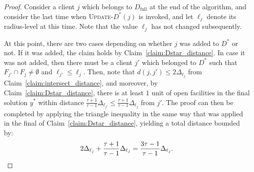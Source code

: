 \begin{proof}
Consider a client $j$ which belongs to $D_\text{full}$ at the end of the algorithm, and consider the last time when \textsc{Update-$D^*$}$(j)$ is invoked, and let $\ell_j$ denote its radius-level at this time. Note that the value $\ell_j$ has not changed subsequently.

At this point, there are two cases depending on whether $j$ was added to $D^*$ or not. If it was added, the claim holds by Claim~\ref{claim:Dstar_distance}. In case it was not added, then there must be a client $j'$ which belonged to $D^*$ such that $F_{j'} \cap F_j \neq \emptyset$ and $\ell_{j'} \le \ell_j$. Then, note that $d(j, j') \le 2\Delta_{\ell_j}$ from Claim~\ref{claim:intersect_distance}, and moreover, by Claim~\ref{claim:Dstar_distance}, there is at least $1$ unit of open facilities in the final solution $y^*$ within distance $\frac{\tau+1}{\tau-1}\Delta_{\ell_{j'}} \le \frac{\tau+1}{\tau-1}\Delta_{\ell_j}$ from $j'$. The proof can then be completed by applying the triangle inequality in the same way that was applied in the final of Claim~\ref{claim:Dstar_distance}, yielding a total distance bounded by:
\[ 2\Delta_{\ell_j} + \frac{\tau+1}{\tau-1}\Delta_{\ell_j} = \frac{3\tau-1}{\tau-1}\Delta_{\ell_j}. \qedhere \]
\end{proof}

